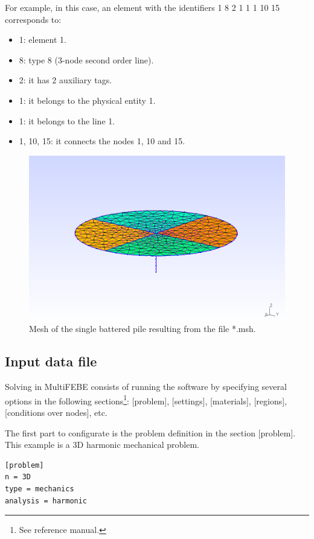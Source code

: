 \documentclass[a4]{article}
\begin{document}
For example, in this case, an element with the identifiers 1 8 2 1 1 1 10 15 corresponds to:

\begin{itemize}
	\item 1: element 1.
	\item 8: type 8 (3-node second order line).
	\item 2: it has 2 auxiliary tags.
	\item 1: it belongs to the physical entity 1.
	\item 1: it belongs to the line 1.
	\item 1, 10, 15: it connects the nodes 1, 10 and 15.
\end{itemize} 

\begin{figure}[h]
	\centering
	\includegraphics[scale = 0.58]{mesh.png}
	\caption{Mesh of the single battered pile resulting from the file *.msh.}
	\label{fig:mesh}
\end{figure}

\subsection{Input data file}
Solving in MultiFEBE consists of running the software by specifying several options in the following sections\footnote{See reference manual.}: [problem], [settings], [materials], [regions], [conditions over nodes], etc.

The first part to configurate is the problem definition in the section [problem]. This example is a 3D harmonic mechanical problem.

\begin{Verbatim}	
[problem]
n = 3D
type = mechanics
analysis = harmonic
\end{Verbatim}
\end{document}

